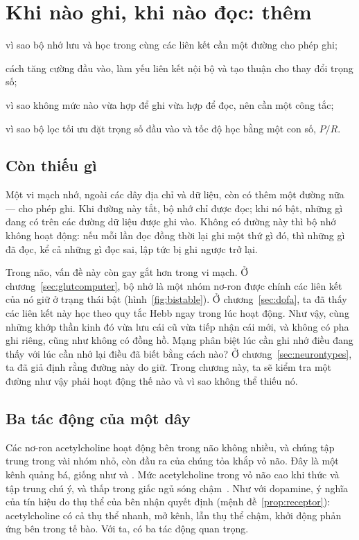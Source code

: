 \chapter{Khi nào ghi, khi nào đọc: thêm }
\label{sec:acet}
\begin{chaptergoals}
\item vì sao bộ nhớ lưu và học trong cùng các liên kết cần một đường cho phép ghi;
\item cách  tăng cường đầu vào, làm yếu liên kết nội bộ và tạo thuận cho thay đổi trọng số;
\item vì sao không mức  nào vừa hợp để ghi vừa hợp để đọc, nên cần một công tắc;
\item vì sao bộ lọc tối ưu đặt trọng số đầu vào và tốc độ học bằng một con số, $P/R$.
\end{chaptergoals}

\section{Còn thiếu gì}

Một vi mạch nhớ, ngoài các dây địa chỉ và dữ liệu, còn có thêm một đường nữa --- cho phép ghi. Khi đường này tắt, bộ nhớ chỉ được đọc; khi nó bật, những gì đang có trên các đường dữ liệu được ghi vào. Không có đường này thì bộ nhớ không hoạt động: nếu mỗi lần đọc đồng thời lại ghi một thứ gì đó, thì những gì đã đọc, kể cả những gì đọc sai, lập tức bị ghi ngược trở lại.

Trong não, vấn đề này còn gay gắt hơn trong vi mạch. Ở chương~\ref{sec:glutcomputer}, bộ nhớ là một nhóm nơ-ron  được chính các liên kết của nó giữ ở trạng thái bật (hình~\ref{fig:bistable}). Ở chương~\ref{sec:dofa}, ta đã thấy các liên kết này học theo quy tắc Hebb ngay trong lúc hoạt động. Như vậy, cùng những khớp thần kinh đó vừa lưu cái cũ vừa tiếp nhận cái mới, và không có pha ghi riêng, cũng như không có đồng hồ. Mạng phân biệt lúc cần ghi nhớ điều đang thấy với lúc cần nhớ lại điều đã biết bằng cách nào? Ở chương~\ref{sec:neurontypes}, ta đã giả định rằng đường này do  giữ. Trong chương này, ta sẽ kiểm tra một đường như vậy phải hoạt động thế nào và vì sao không thể thiếu nó.

\section{Ba tác động của một dây}

Các nơ-ron acetylcholine hoạt động bên trong não không nhiều, và chúng tập trung trong vài nhóm nhỏ, còn đầu ra của chúng tỏa khắp vỏ não. Đây là một kênh quảng bá, giống như  và . Mức acetylcholine trong vỏ não cao khi thức và tập trung chú ý, và thấp trong giấc ngủ sóng chậm~\cite{Hasselmo1999}. Như với dopamine, ý nghĩa của tín hiệu do thụ thể của bên nhận quyết định (mệnh đề~\ref{prop:receptor}): acetylcholine có cả thụ thể nhanh, mở kênh, lẫn thụ thể chậm, khởi động phản ứng bên trong tế bào. Với ta, có ba tác động quan trọng.

